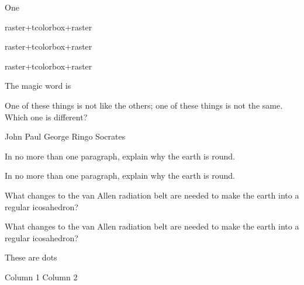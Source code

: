 \documentclass{exam}
\begin{document}
	
\begin{tcbraster}[raster equal height=rows,
	raster every box/.style={colframe=red!50!black,colback=red!10!white},
	height=6in
]
	\begin{tcolorbox}[blankest,height fill,raster columns=1]
		\begin{tcbraster}[raster columns=1,height=5in,raster equal height=rows]
			\begin{tcolorbox}[height fill=maximum]One\end{tcolorbox}
				\begin{tcolorbox}[height fill=maximum]raster+tcolorbox+raster\end{tcolorbox}
					\begin{tcolorbox}[height fill=maximum]raster+tcolorbox+raster\end{tcolorbox}
		\end{tcbraster}
	\end{tcolorbox}
	\begin{tcolorbox}raster+tcolorbox+raster\end{tcolorbox}
\end{tcbraster}


\newpage
	
The magic word is \fillin

\checkboxchar{$\Box$}

\begin{questions}
	\question One of these things is not like the others; one of these
	things is not the same. Which one is different?
	\begin{oneparcheckboxes}
		\choice John
		\choice Paul
		\choice George
		\choice Ringo
		\CorrectChoice Socrates
	\end{oneparcheckboxes}

\question
In no more than one paragraph, explain why the earth is round.
\makeemptybox{1in}


In no more than one paragraph, explain why the earth is round.

What changes to the van Allen radiation belt are needed to make
the earth into a regular icosahedron?
\fillwithlines{1in}

\setlength\linefillheight{.5in}

\question What changes to the van Allen radiation belt are needed to make
the earth into a regular icosahedron?

These are dots
\fillwithdottedlines{1in}

\begin{multicols}{2}
	Column 1
	\columnbreak
	Column 2
\end{multicols}


\end{questions}

\newpage
\end{document}
